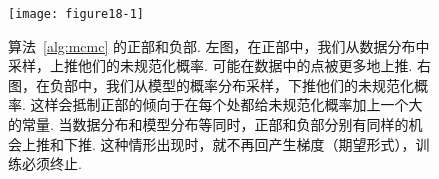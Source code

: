 \begin{figure}[htp]
\centering \texttt{[image: figure18-1]} 
\caption{算法~\ref{alg:mcmc} 的正部和负部. 左图，在正部中，我们从数据分布中采样，上推他们的未规范化概率. 可能在数据中的点被更多地上推. 右图，在负部中，我们从模型的概率分布采样，下推他们的未规范化概率. 这样会抵制正部的倾向于在每个处都给未规范化概率加上一个大的常量. 当数据分布和模型分布等同时，正部和负部分别有同样的机会上推和下推. 这种情形出现时，就不再回产生梯度（期望形式），训练必须终止.} 
\label{fig:18.1}
\end{figure}



